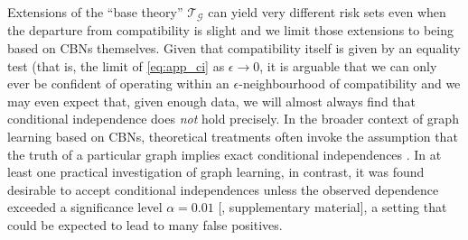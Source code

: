 Extensions of the ``base theory'' $\mathscr{T}_{\mathcal{G}}$ can yield very different risk sets even when the departure from compatibility is slight and we limit those extensions to being based on CBNs themselves. Given that compatibility itself is given by an equality test (that is, the limit of \ref{eq:app_ci} as $\epsilon \to 0$, it is arguable that we can only ever be confident of operating within an $\epsilon$-neighbourhood of compatibility and we may even expect that, given enough data, we will almost always find that conditional independence does \emph{not} hold precisely\citep{gelman_bayesian_2010,meehl_theory-testing_1967,berkson_difficulties_1938}. In the broader context of graph learning based on CBNs, theoretical treatments often invoke the assumption that the truth of a particular graph implies exact conditional independences \citep{meek_strong_1995}. In at least one practical investigation of graph learning, in contrast, it was found desirable to accept conditional independences unless the observed dependence exceeded a significance level $\alpha=0.01$ [\cite{maathuis_predicting_2010}, supplementary material], a setting that could be expected to lead to many false positives.